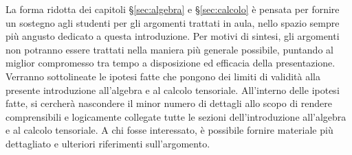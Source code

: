 \vspace{0.5cm}
La forma ridotta dei capitoli \S\ref{sec:algebra} e \S\ref{sec:calcolo} è pensata per fornire un sostegno agli studenti per gli argomenti trattati in aula, nello spazio sempre più angusto dedicato a questa introduzione. Per motivi di sintesi, gli argomenti non potranno essere trattati nella maniera più generale possibile, puntando al miglior compromesso tra tempo a disposizione ed efficacia della presentazione. Verranno sottolineate le ipotesi fatte che pongono dei limiti di validità alla presente introduzione all'algebra e al calcolo tensoriale. All'interno delle ipotesi fatte, si cercherà nascondere il minor numero di dettagli allo scopo di rendere comprensibili e logicamente collegate tutte le sezioni dell'introduzione all'algebra e al calcolo tensoriale.
A chi fosse interessato, è possibile fornire materiale più dettagliato e ulteriori riferimenti sull'argomento.
